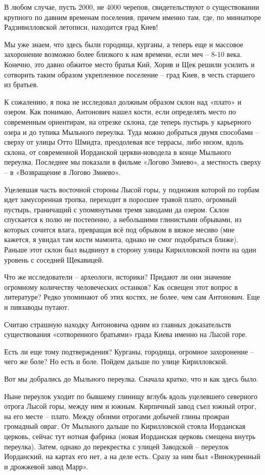 В любом случае, пусть 2000, не 4000 черепов, свидетельствуют о существовании крупного по давним временам поселения, причем именно там, где, по миниатюре Радзивилловской летописи, находится град Киев!

Мы уже знаем, что здесь были городища, курганы, а теперь еще и массовое захоронение возможно более близкого к нам времени, если меч – 8-10 века. Конечно, это давно обжитое место братья Кий, Хорив и Щек решили усилить и сотворить таким образом укрепленное поселение – град Киев, в честь старшего из братьев.

К сожалению, я пока не исследовал должным образом склон над «плато» и озером. Как понимаю, Антонович нашел кости, если определять место по современным ориентирам, на отрезке склона, где теперь пустырь у карьерного озера и до тупика Мыльного переулка. Туда можно добраться двумя способами – сверху от улицы Отто Шмидта, преодолевая все террасы, либо низом, вдоль склона, от современной Иорданской церкви-новодела в конце Мыльного переулка. Последнее мы показали в фильме «Логово Змиево», а местность сверху – в «Возвращение в Логово Змиево».

Уцелевшая часть восточной стороны Лысой горы, у подножия которой по горбам идет замусоренная тропка, переходит в поросшее травой плато, огромный пустырь, граничащий с упомянутыми тремя заводами да озером. Склон спускается к полю не постепенно, а небольшими глинистыми обрывами, из которых сочится влага, превращая всё под обрывом в вязкое месиво (мне кажется, я увидал там кости мамонта, однако не смог подобраться ближе). Раньше этот склон был выдвинут в сторону улицы Кирилловской почти на один уровень с соседней Щекавицей.

Что же исследователи – археологи, историки? Придают ли они значение огромному количеству человеческих останков? Как освещен этот вопрос в литературе? Редко упоминают об этих костях, не более, чем сам Антонович. Еще и пивзаводы путают. 

Считаю страшную находку Антоновича одним из главных доказательств существования «сотворенного братьями» града Киева именно на Лысой горе.

Есть ли еще тому подтверждения? Курганы, городища, огромное захоронение – чего же боле? Но есть и боле. Пойдем дальше по улице Кирилловской.

Вот мы добрались до Мыльного переулка. Сначала кратко, что и как здесь было.

Ныне переулок уходит по бывшему глинищу вглубь вдоль уцелевшего северного отрога Лысой горы, между ним и южным. Кирпичный завод съел южный отрог, на его месте – плато. Между обоими отрогами добычей глины прожран громадный овраг. От Мыльного дальше по Кирилловской стояла Иорданская церковь, сейчас тут нотная фабрика (новая Иорданская церковь смещена внутрь переулка). Затем, однако до перекрестка с улицей Заводской – переулок Иорданский, на картах его нет, а на деле есть. Сразу за ним был «Винокуренный и дрожжевой завод Марр».

